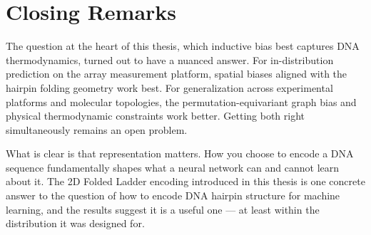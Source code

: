\documentclass[12pt,oneside,letterpaper]{report}
\begin{document}
\section{Closing Remarks}

The question at the heart of this thesis, which inductive bias best captures DNA thermodynamics, turned out to have a nuanced answer. For in-distribution prediction on the array measurement platform, spatial biases aligned with the hairpin folding geometry work best. For generalization across experimental platforms and molecular topologies, the permutation-equivariant graph bias and physical thermodynamic constraints work better. Getting both right simultaneously remains an open problem.

What is clear is that representation matters. How you choose to encode a DNA sequence fundamentally shapes what a neural network can and cannot learn about it. The 2D Folded Ladder encoding introduced in this thesis is one concrete answer to the question of how to encode DNA hairpin structure for machine learning, and the results suggest it is a useful one --- at least within the distribution it was designed for.
\end{document}
